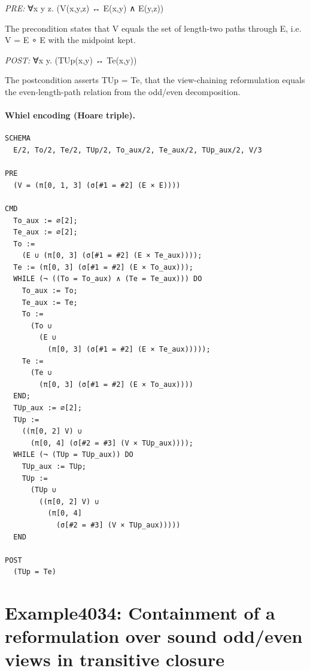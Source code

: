 \documentclass[10pt]{article}
\begin{document}
\textit{PRE:} ∀x y z. (V(x,y,z) ↔ E(x,y) ∧ E(y,z))\par The precondition states that V equals the set of length-two paths through E, i.e. V = E ∘ E with the midpoint kept.

\textit{POST:} ∀x y. (TUp(x,y) ↔ Te(x,y))\par The postcondition asserts TUp = Te, that the view-chaining reformulation equals the even-length-path relation from the odd/even decomposition.

\paragraph{Whiel encoding (Hoare triple).}

\begin{Verbatim}[fontsize=\tiny,breaklines=true,breakanywhere=true,frame=single,framesep=1.5mm]
SCHEMA
  E/2, To/2, Te/2, TUp/2, To_aux/2, Te_aux/2, TUp_aux/2, V/3

PRE
  (V = (π[0, 1, 3] (σ[#1 = #2] (E × E))))

CMD
  To_aux := ∅[2];
  Te_aux := ∅[2];
  To :=
    (E ∪ (π[0, 3] (σ[#1 = #2] (E × Te_aux))));
  Te := (π[0, 3] (σ[#1 = #2] (E × To_aux)));
  WHILE (¬ ((To = To_aux) ∧ (Te = Te_aux))) DO
    To_aux := To;
    Te_aux := Te;
    To :=
      (To ∪
        (E ∪
          (π[0, 3] (σ[#1 = #2] (E × Te_aux)))));
    Te :=
      (Te ∪
        (π[0, 3] (σ[#1 = #2] (E × To_aux))))
  END;
  TUp_aux := ∅[2];
  TUp :=
    ((π[0, 2] V) ∪
      (π[0, 4] (σ[#2 = #3] (V × TUp_aux))));
  WHILE (¬ (TUp = TUp_aux)) DO
    TUp_aux := TUp;
    TUp :=
      (TUp ∪
        ((π[0, 2] V) ∪
          (π[0, 4]
            (σ[#2 = #3] (V × TUp_aux)))))
  END

POST
  (TUp = Te)
\end{Verbatim}

\Needspace{0.45\textheight}

\section{Example4034: Containment of a reformulation over sound odd/even views in transitive closure}\label{case:Example4034}
\end{document}
